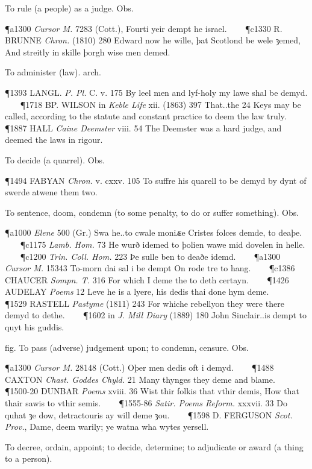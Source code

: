 \begin{description}[wide, labelwidth=!, labelindent=0pt]
\begin{myenumerate}
 To rule (a people) as a judge. Obs.

\P a1300  \textit{Cursor M.} 7283 (Cott.), Fourti yeir dempt he israel.    
\P c1330 R. BRUNNE  \textit{Chron.} (1810) 280 Edward now he wille, þat Scotlond be wele ȝemed, And streitly in skille þorgh wise men demed.

 To administer (law). arch.

\P 1393 LANGL.  \textit{P. Pl.} C. v. 175 By leel men and lyf-holy my lawe shal be demyd.    
\P 1718 BP. WILSON in  \textit{Keble Life} xii. (1863) 397 That..the 24 Keys may be called, according to the statute and constant practice to deem the law truly.    
\P 1887 HALL  \textit{Caine Deemster} viii. 54 The Deemster was a hard judge, and deemed the laws in rigour.

 To decide (a quarrel). Obs.

\P 1494 FABYAN \textit{Chron.} v. cxxv. 105 To suffre his quarell to be demyd by dynt of swerde atwene them two.

 To sentence, doom, condemn (to some penalty, to do or suffer something). Obs.

\P a1000 \textit{Elene}  500 (Gr.) Swa he..to cwale moniᴁe Cristes folces demde, to deaþe.    
\P c1175  \textit{Lamb. Hom.} 73 He wurð idemed to þolien wawe mid dovelen in helle.    
\P c1200  \textit{Trin. Coll. Hom.} 223 Þe sulle ben to deaðe idemd.    
\P a1300  \textit{Cursor M.} 15343 To-morn dai sal i be dempt On rode tre to hang.    
\P c1386 CHAUCER  \textit{Sompn. T.} 316 For which I deme the to deth certayn.    
\P 1426 AUDELAY  \textit{Poems} 12 Leve he is a lyere, his dedis thai done hym deme.    
\P 1529 RASTELL  \textit{Pastyme} (1811) 243 For whiche rebellyon they were there demyd to dethe.    
\P 1602 in  \textit{J. Mill Diary} (1889) 180 John Sinclair..is dempt to quyt his guddis.

 fig. To pass (adverse) judgement upon; to condemn, censure. Obs.

\P a1300  \textit{Cursor M.} 28148 (Cott.) Oþer men dedis oft i demyd.    
\P 1488 CAXTON  \textit{Chast. Goddes Chyld.} 21 Many thynges they deme and blame.    
\P 1500-20 DUNBAR  \textit{Poems} xviii. 36 Wist thir folkis that vthir demis, How that thair sawis to vthir semis.    
\P 1555-86  \textit{Satir. Poems Reform.} xxxvii. 33 Do quhat ȝe dow, detractouris ay will deme ȝou.    
\P 1598 D. FERGUSON  \textit{Scot. Prov.}, Dame, deem warily; ye watna wha wytes yersell.

 To decree, ordain, appoint; to decide, determine; to adjudicate or award (a thing to a person).


\end{myenumerate}
\end{description}
